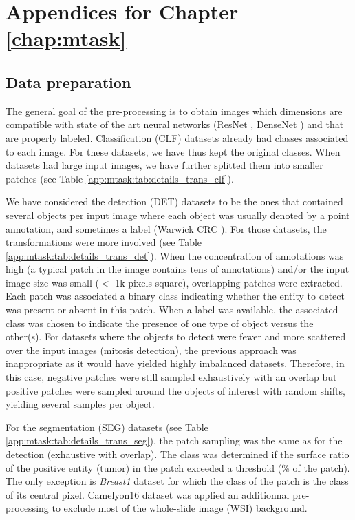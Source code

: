 \chapter{Appendices for Chapter \ref{chap:mtask}}
\label{app:mtask}

\section{Data preparation}
\label{app:mtask:sec:datasets}

The general goal of the pre-processing is to obtain images which dimensions are compatible with state of the art neural networks (\eg ResNet \cite{he2016deep}, DenseNet \cite{huang2017densely}) and that are properly labeled. Classification (CLF) datasets already had classes associated to each image. For these datasets, we have thus kept the original classes. When datasets had large input images, we have further splitted them into smaller patches (see Table \ref{app:mtask:tab:details_trans_clf}).

We have considered the detection (DET) datasets to be the ones that contained several objects per input image where each object was usually denoted by a point annotation, and sometimes a label (\eg Warwick CRC \cite{sirinukunwattana2016locality}). For those datasets, the transformations were more involved (see Table \ref{app:mtask:tab:details_trans_det}). When the concentration of annotations was high (\ie a typical patch in the image contains tens of annotations) and/or the input image size was small (\ie $<$ 1k pixels square), overlapping patches were extracted. Each patch was associated a binary class indicating whether the entity to detect was present or absent in this patch. When a label was available, the associated class was chosen to indicate the presence of one type of object versus the other(s). For datasets where the objects to detect were fewer and more scattered over the input images (\eg mitosis detection), the previous approach was inappropriate as it would have yielded highly imbalanced datasets. Therefore, in this case, negative patches were still sampled exhaustively with an overlap but positive patches were sampled around the objects of interest with random shifts, yielding several samples per object. 

For the segmentation (SEG) datasets (see Table \ref{app:mtask:tab:details_trans_seg}), the patch sampling was the same as for the detection (\ie exhaustive with overlap). The class was determined if the surface ratio of the positive entity (\eg tumor) in the patch exceeded a threshold (\% of the patch). The only exception is \textit{Breast1} dataset for which the class of the patch is the class of its central pixel. Camelyon16 \cite{bejnordi2017diagnostic} dataset was applied an additionnal pre-processing to exclude most of the whole-slide image (WSI) background.

